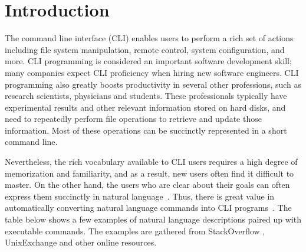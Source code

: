 \section{Introduction}


The command line interface (CLI) enables users to perform a rich set of actions including file system manipulation, remote control, system configuration, and more. CLI programming is considered an important software development skill; many companies expect CLI proficiency when hiring new software engineers. CLI programming also greatly boosts productivity in several other professions, such as research scientists, physicians and students. These professionals typically have experimental results and other relevant information stored on hard disks, and need to repeatedly perform file operations to retrieve and update those information. Most of these operations can be succinctly represented in a short command line.

Nevertheless, the rich vocabulary available to CLI users requires a high degree of memorization and familiarity, and as a result, new users often find it difficult to master. On the other hand, %
the users who are clear about their goals can often express them succinctly in natural language~\cite{Myers:2004:NPL:1015864.1015888}. Thus, there is great value in automatically converting natural language commands into CLI programs~\cite{Pederson-Report,zoltan1991get,Manaris:1994:DNL:198125.198137}. The table below shows a few examples of natural language descriptions paired up with executable commands. The examples are gathered from StackOverflow
, UnixExchange
and other online resources.

